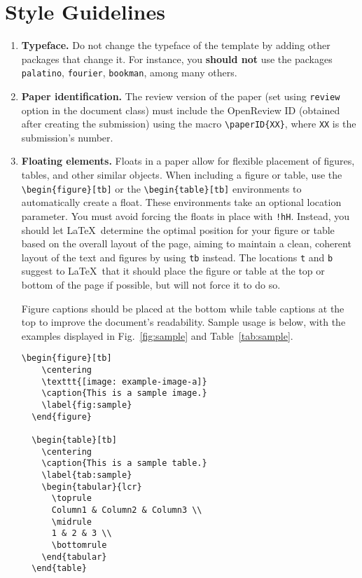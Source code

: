 \documentclass[fullpaper]{nldl}
\begin{document}
\section{Style Guidelines}

\begin{enumerate}[leftmargin=*]

\item \textbf{Typeface.}
Do not change the typeface of the template by adding other packages that change it.
For instance, you \textbf{should not} use the packages \verb|palatino|, \verb|fourier|, \verb|bookman|, among many others.

\item \textbf{Paper identification.}
The review version of the paper (set using \verb|review| option in the document class) must include the OpenReview ID (obtained after creating the submission) using the macro \verb|\paperID{XX}|, where \verb|XX| is the submission's number.

\item \textbf{Floating elements.}
Floats in a paper allow for flexible placement of figures, tables, and other similar objects.
When including a figure or table, use the \verb|\begin{figure}[tb]| or the \verb|\begin{table}[tb]| environments to automatically create a float.
These environments take an optional location parameter.
You must avoid forcing the floats in place with \verb|!hH|.
Instead, you should let \LaTeX\ determine the optimal position for your figure or table based on the overall layout of the page, aiming to maintain a clean, coherent layout of the text and figures by using \verb|tb| instead.
The locations \verb|t| and \verb|b| suggest to \LaTeX\ that it should place the figure or table at the top or bottom of the page if possible, but will not force it to do so.

Figure captions should be placed at the bottom while table captions at the top to improve the document's readability.
Sample usage is below, with the examples displayed in Fig.~\ref{fig:sample} and Table~\ref{tab:sample}.
\begin{lstlisting}[gobble=2]
  \begin{figure}[tb]
    \centering
    \texttt{[image: example-image-a]}
    \caption{This is a sample image.}
    \label{fig:sample}
  \end{figure}

  \begin{table}[tb]
    \centering
    \caption{This is a sample table.}
    \label{tab:sample}
    \begin{tabular}{lcr}
      \toprule
      Column1 & Column2 & Column3 \\
      \midrule
      1 & 2 & 3 \\
      \bottomrule
    \end{tabular}
  \end{table}
\end{lstlisting}


\end{enumerate}
\end{document}

